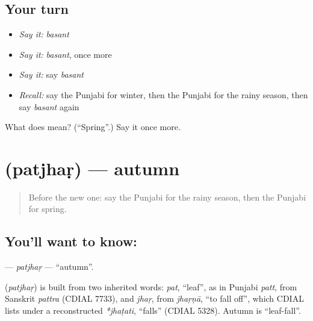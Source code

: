 \subsection*{Your turn}
\begin{itemize}
\raggedright
  \item \emph{Say it:} \emph{basant}
  \item \emph{Say it:} \emph{basant}, once more
  \item \emph{Say it:} say \emph{basant}
  \item \emph{Recall:} say the Punjabi for winter, then the Punjabi for the rainy season, then say \emph{basant} again
\end{itemize}

\begin{tcolorbox}[breakable,colback=teal!4,colframe=teal!35!black,title={Before you move on}]
What does  mean? (\textquotedblleft{}Spring\textquotedblright{}.) Say it once more.
\end{tcolorbox}
\section[\texorpdfstring{\pa{ਪਤਝੜ} (patjhaṛ)}{ਪਤਝੜ (patjhaṛ)}]{ (patjhaṛ) — autumn}

\label{lesson:PA-C100-patjhar}



\begin{quote}
Before the new one: say the Punjabi for the rainy season, then the Punjabi for spring.
\end{quote}

\subsection*{You'll want to know: }
\textbf{} — \emph{patjhaṛ} — \textquotedblleft{}autumn\textquotedblright{}.

\begin{cousinweb}
\textbf{} (\emph{patjhaṛ}) is built from two inherited words: \emph{pat}, \textquotedblleft{}leaf\textquotedblright{}, as in Punjabi \emph{patt}, from Sanskrit \emph{pattra} (CDIAL 7733), and \emph{jhaṛ}, from \emph{jhaṛṇā}, \textquotedblleft{}to fall off\textquotedblright{}, which CDIAL lists under a reconstructed \emph{*jhaṭati}, \textquotedblleft{}falls\textquotedblright{} (CDIAL 5328). Autumn is \textquotedblleft{}leaf-fall\textquotedblright{}.
\end{cousinweb}

